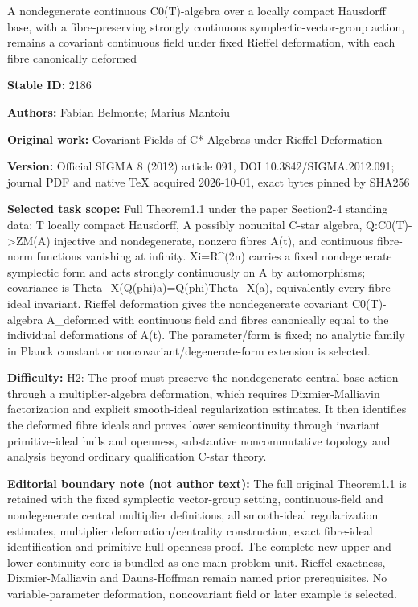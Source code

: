 \documentclass[11pt]{article}
\begin{document}
\begin{center}\Large A nondegenerate continuous C0(T)-algebra over a locally compact Hausdorff base, with a fibre-preserving strongly continuous symplectic-vector-group action, remains a covariant continuous field under fixed Rieffel deformation, with each fibre canonically deformed\end{center}
\noindent\textbf{Stable ID:} 2186\par
\noindent\textbf{Authors:} Fabian Belmonte; Marius Mantoiu\par
\noindent\textbf{Original work:} Covariant Fields of C*\allowbreak{}-Algebras under Rieffel Deformation\par
\noindent\textbf{Version:} Official SIGMA 8 (2012) article 091, DOI 10.3842/SIGMA.2012.091; journal PDF and native TeX acquired 2026-10-01, exact bytes pinned by SHA256\par
\noindent\textbf{Selected task scope:} Full Theorem1.1 under the paper Section2-4 standing data: T locally compact Hausdorff, A possibly nonunital C-star algebra, Q:C0(T)->ZM(A) injective and nondegenerate, nonzero fibres A(t), and continuous fibre-norm functions vanishing at infinity. Xi=\allowbreak{}R\textasciicircum{}(2n) carries a fixed nondegenerate symplectic form and acts strongly continuously on A by automorphisms; covariance is Theta\_X(Q(phi)a)=\allowbreak{}Q(phi)Theta\_X(a), equivalently every fibre ideal invariant. Rieffel deformation gives the nondegenerate covariant C0(T)-algebra A\_deformed with continuous field and fibres canonically equal to the individual deformations of A(t). The parameter/form is fixed; no analytic family in Planck constant or noncovariant/degenerate-form extension is selected.\par
\noindent\textbf{Difficulty:} H2: The proof must preserve the nondegenerate central base action through a multiplier-algebra deformation, which requires Dixmier-Malliavin factorization and explicit smooth-ideal regularization estimates. It then identifies the deformed fibre ideals and proves lower semicontinuity through invariant primitive-ideal hulls and openness, substantive noncommutative topology and analysis beyond ordinary qualification C-star theory.\par
\noindent\textbf{Editorial boundary note (not author text):} The full original Theorem1.1 is retained with the fixed symplectic vector-group setting, continuous-field and nondegenerate central multiplier definitions, all smooth-ideal regularization estimates, multiplier deformation/centrality construction, exact fibre-ideal identification and primitive-hull openness proof. The complete new upper and lower continuity core is bundled as one main problem unit. Rieffel exactness, Dixmier-Malliavin and Dauns-Hoffman remain named prior prerequisites. No variable-parameter deformation, noncovariant field or later example is selected.\par
\end{document}
